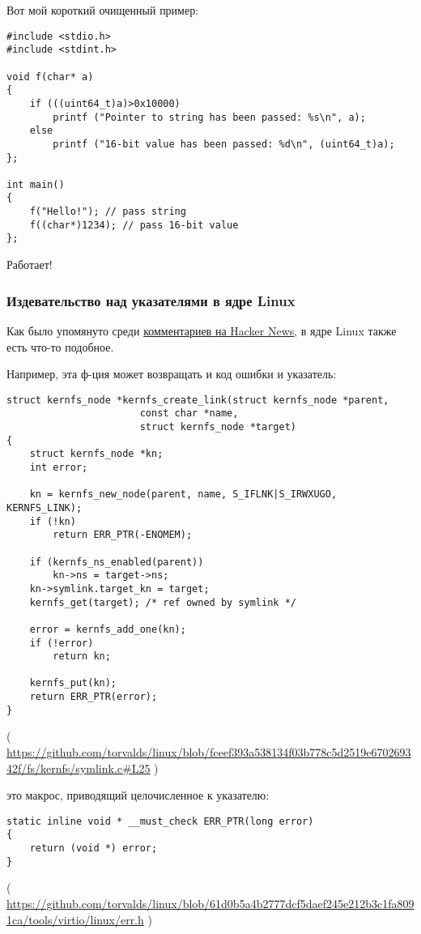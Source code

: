 Вот мой короткий очищенный пример:

\begin{lstlisting}[style=customc]
#include <stdio.h>
#include <stdint.h>

void f(char* a)
{
	if (((uint64_t)a)>0x10000)
		printf ("Pointer to string has been passed: %s\n", a);
	else
		printf ("16-bit value has been passed: %d\n", (uint64_t)a);
};

int main()
{
	f("Hello!"); // pass string
	f((char*)1234); // pass 16-bit value
};
\end{lstlisting}

Работает!

\subsubsection{Издевательство над указателями в ядре Linux}

Как было упомянуто среди \href{https://news.ycombinator.com/item?id=11823647}{комментариев на Hacker News},
в ядре Linux также есть что-то подобное.

Например, эта ф-ция может возвращать и код ошибки и указатель:

\begin{lstlisting}[style=customc]
struct kernfs_node *kernfs_create_link(struct kernfs_node *parent,
				       const char *name,
				       struct kernfs_node *target)
{
	struct kernfs_node *kn;
	int error;

	kn = kernfs_new_node(parent, name, S_IFLNK|S_IRWXUGO, KERNFS_LINK);
	if (!kn)
		return ERR_PTR(-ENOMEM);

	if (kernfs_ns_enabled(parent))
		kn->ns = target->ns;
	kn->symlink.target_kn = target;
	kernfs_get(target);	/* ref owned by symlink */

	error = kernfs_add_one(kn);
	if (!error)
		return kn;

	kernfs_put(kn);
	return ERR_PTR(error);
}
\end{lstlisting}

( \url{https://github.com/torvalds/linux/blob/fceef393a538134f03b778c5d2519e670269342f/fs/kernfs/symlink.c#L25} )

 это макрос, приводящий целочисленное к указателю:

\begin{lstlisting}[style=customc]
static inline void * __must_check ERR_PTR(long error)
{
	return (void *) error;
}
\end{lstlisting}

( \url{https://github.com/torvalds/linux/blob/61d0b5a4b2777dcf5daef245e212b3c1fa8091ca/tools/virtio/linux/err.h} )

